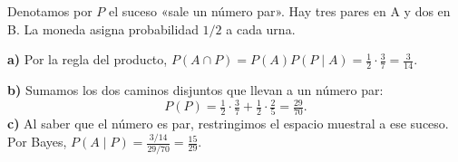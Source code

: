 Denotamos por $P$ el suceso «sale un número par». Hay tres pares en A y dos en B. La moneda asigna probabilidad $1/2$ a cada urna.

\textbf{a)} Por la regla del producto,
$P(A\cap P)=P(A)P(P\mid A)=\frac12\cdot\frac37=\boxed{\frac{3}{14}}$.

\textbf{b)} Sumamos los dos caminos disjuntos que llevan a un número par:
\[
P(P)=\tfrac12\cdot\tfrac37+\tfrac12\cdot\tfrac25=\boxed{\tfrac{29}{70}}.
\]
\textbf{c)} Al saber que el número es par, restringimos el espacio muestral a ese suceso. Por Bayes,
$P(A\mid P)=\frac{3/14}{29/70}=\boxed{\frac{15}{29}}$.
